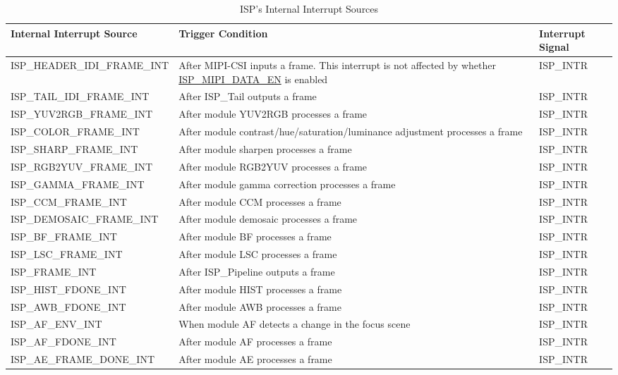 \documentclass[main\_\_EN.tex]{subfiles}
\begin{document}
\begin{longtable}{ | L{5.5cm} | L{6.5cm} | L{3cm} | }
\caption{ISP's Internal Interrupt Sources} \label{tab:isp-int-sources}
\\ \hline
{}
\textbf{Internal Interrupt Source} & \textbf{Trigger Condition}  &  \textbf{Interrupt Signal}\\ \hline
    ISP\_HEADER\_IDI\_FRAME\_INT & After MIPI-CSI inputs a frame. This interrupt is not affected by whether \hyperref[fielddesc:ISPMIPIDATAEN]{ISP\_MIPI\_DATA\_EN} is enabled & ISP\_INTR \\ \hline
    ISP\_TAIL\_IDI\_FRAME\_INT & After ISP\_Tail outputs a frame & ISP\_INTR \\ \hline
    ISP\_YUV2RGB\_FRAME\_INT & After module YUV2RGB processes a frame & ISP\_INTR \\ \hline
    ISP\_COLOR\_FRAME\_INT & After module contrast/hue/saturation/luminance adjustment processes a frame & ISP\_INTR \\ \hline
    ISP\_SHARP\_FRAME\_INT & After module sharpen processes a frame & ISP\_INTR \\ \hline
    ISP\_RGB2YUV\_FRAME\_INT & After module RGB2YUV processes a frame & ISP\_INTR \\ \hline
    ISP\_GAMMA\_FRAME\_INT & After module gamma correction processes a frame & ISP\_INTR \\ \hline
    ISP\_CCM\_FRAME\_INT & After module CCM processes a frame & ISP\_INTR \\ \hline
    ISP\_DEMOSAIC\_FRAME\_INT & After module demosaic processes a frame & ISP\_INTR \\ \hline
    ISP\_BF\_FRAME\_INT & After module BF processes a frame & ISP\_INTR \\ \hline
    ISP\_LSC\_FRAME\_INT & After module LSC processes a frame & ISP\_INTR \\ \hline
    ISP\_FRAME\_INT & After ISP\_Pipeline outputs a frame & ISP\_INTR \\ \hline
    ISP\_HIST\_FDONE\_INT & After module HIST processes a frame & ISP\_INTR \\ \hline
    ISP\_AWB\_FDONE\_INT & After module AWB processes a frame & ISP\_INTR \\ \hline
    ISP\_AF\_ENV\_INT & When module AF detects a change in the focus scene & ISP\_INTR \\ \hline
    ISP\_AF\_FDONE\_INT & After module AF processes a frame & ISP\_INTR \\ \hline
    ISP\_AE\_FRAME\_DONE\_INT & After module AE processes a frame & ISP\_INTR \\ \hline

\end{longtable}
\end{document}
